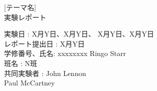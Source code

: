 \documentclass[a4j]{jsarticle}
\begin{document}
 \pagestyle{empty}


\begin{center}
\huge{\hspace{-360pt}[テーマ名]} \\
\vspace{10pt}
 \huge{\hspace{-360pt}実験レポート} \\
 \vspace{10pt}
\vspace{250pt}

\end{center}
\setlength{\oddsidemargin}{180pt}
 \noindent
 \large{ 実験日 : X月Y日、X月Y日、 X月Y日、X月Y日}\\
 \large{ レポート提出日 : X月Y日}\\
 \large{ 学修番号、氏名: xxxxxxxx Ringo Starr}\\
 \large{ 班名 : N班}\\
 \large{ 共同実験者 :  John Lennon}\\
 \large{ \hspace{5.6zw} Paul McCartney}\\



 \pagebreak


\newpage

\setlength{\oddsidemargin}{0pt}

\pagestyle{plain}
   \setcounter{page}{1}

   
\end{document}
